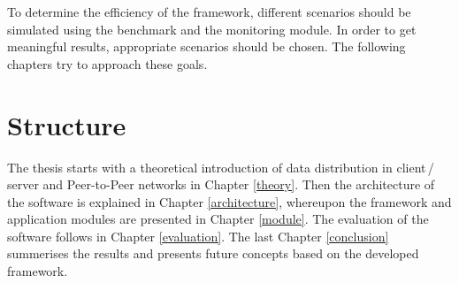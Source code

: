 To determine the efficiency of the framework, different scenarios should be simulated using the benchmark and the monitoring module. In order to get meaningful results, appropriate scenarios should be chosen. The following chapters try to approach these goals.

\section{Structure}
The thesis starts with a theoretical introduction of data distribution in client\,/\,server and Peer-to-Peer networks in Chapter \ref{theory}. Then the architecture of the software is explained in Chapter \ref{architecture}, whereupon the framework and application modules are presented in Chapter \ref{module}. The evaluation of the software follows in Chapter \ref{evaluation}. The last Chapter \ref{conclusion} summerises the results and presents future concepts based on the developed framework.